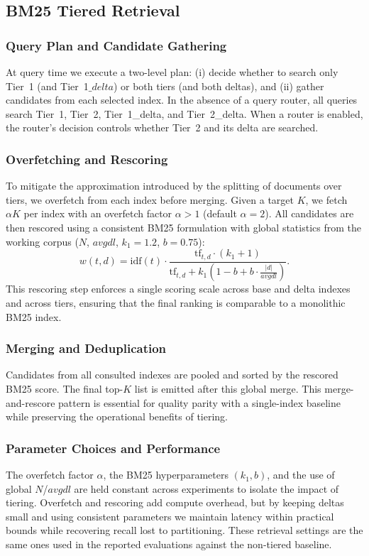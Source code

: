 \documentclass[11pt]{article}
\begin{document}
\subsection{BM25 Tiered Retrieval}
\subsubsection{Query Plan and Candidate Gathering}
At query time we execute a two-level plan: (i) decide whether to search only Tier~1 (and Tier~1$\_delta$) or both tiers (and both deltas), and (ii) gather candidates from each selected index. In the absence of a query router, all queries search Tier~1, Tier~2, Tier~1\_delta, and Tier~2\_delta. When a router is enabled, the router’s decision controls whether Tier~2 and its delta are searched.

\subsubsection{Overfetching and Rescoring}
To mitigate the approximation introduced by the splitting of documents over tiers, we overfetch from each index before merging. Given a target $K$, we fetch $\alpha K$ per index with an overfetch factor $\alpha > 1$ (default $\alpha = 2$). All candidates are then rescored using a consistent BM25 formulation with global statistics from the working corpus ($N$, $\mathit{avgdl}$, $k_1 = 1.2$, $b = 0.75$):
\[
w(t, d) = \text{idf}(t) \cdot \frac{ \text{tf}_{t,d} \cdot (k_1 + 1)}{\text{tf}_{t,d} + k_1 \left(1 - b + b \cdot \frac{|d|}{\mathit{avgdl}}\right)}.
\]
This rescoring step enforces a single scoring scale across base and delta indexes and across tiers, ensuring that the final ranking is comparable to a monolithic BM25 index.

\subsubsection{Merging and Deduplication}
Candidates from all consulted indexes are pooled and sorted by the rescored BM25 score. The final top-$K$ list is emitted after this global merge. This merge-and-rescore pattern is essential for quality parity with a single-index baseline while preserving the operational benefits of tiering.

\subsubsection{Parameter Choices and Performance}
The overfetch factor $\alpha$, the BM25 hyperparameters $(k_1, b)$, and the use of global $N$/$\mathit{avgdl}$ are held constant across experiments to isolate the impact of tiering. Overfetch and rescoring add compute overhead, but by keeping deltas small and using consistent parameters we maintain latency within practical bounds while recovering recall lost to partitioning. These retrieval settings are the same ones used in the reported evaluations against the non-tiered baseline.
\end{document}
